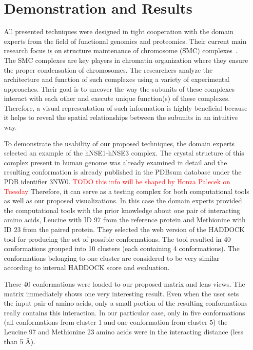 \documentclass[journal]{vgtc}                %
\begin{document}
\section{Demonstration and Results}
All presented techniques were designed in tight cooperation with the domain experts from the field of functional genomics and proteomics.
Their current main research focus is on structure maintenance of chromosome (SMC) complexes~\cite{Hudson2011,Guerineau2012,Palecek2015}. 
The SMC complexes are key players in chromatin organization where they ensure the proper condensation of chromosomes. 
The researchers analyze the architecture and function of such complexes using a variety of experimental approaches. 
Their goal is to uncover the way the subunits of these complexes interact with each other and execute unique function(s) of these complexes. 
Therefore, a visual representation of such information is highly beneficial because it helps to reveal the spatial relationships between the subunits in an intuitive way.

To demonstrate the usability of our proposed techniques, the domain experts selected an example of the hNSE1-hNSE3 complex.
The crystal structure of this complex present in human genome was already examined in detail and the resulting conformation is already published in the PDBsum database under the PDB identifier 3NW0. 
\textcolor{red}{TODO this info will be shaped by Honza Palecek on Tuesday}
Therefore, it can serve as a testing complex for both computational tools as well as our proposed visualizations.
In this case the domain experts provided the computational tools with the prior knowledge about one pair of interacting amino acids, Leucine with ID 97 from the reference protein and Methionine with ID 23 from the paired protein.
They selected the web version of the HADDOCK tool for producing the set of possible conformations. 
The tool resulted in 40 conformations grouped into 10 clusters (each containing 4 conformations).
The conformations belonging to one cluster are considered to be very similar according to internal HADDOCK score and evaluation.

These 40 conformations were loaded to our proposed matrix and lens views. 
The matrix immediately shows one very interesting result.
Even when the user sets the input pair of amino acids, only a small portion of the resulting conformations really contains this interaction.
In our particular case, only in five conformations (all conformations from cluster 1 and one conformation from cluster 5) the Leucine 97 and Methionine 23 amino acids were in the interacting distance (less than 5 \AA ).
\end{document}
